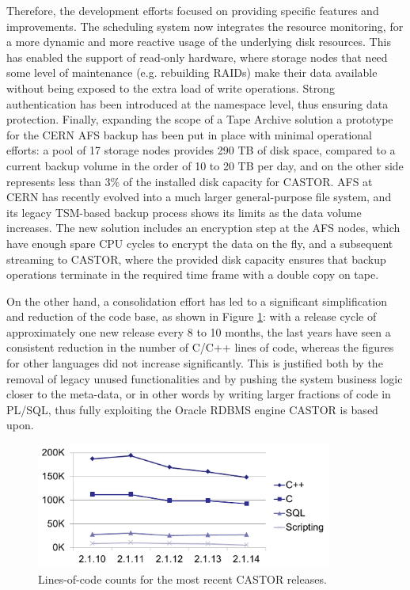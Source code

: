 \documentclass[a4paper]{jpconf}
\begin{document}
Therefore, the development efforts focused on providing specific features and improvements. The scheduling system now integrates the resource monitoring, for a more dynamic and more reactive usage of the underlying disk resources. This has enabled the support of read-only hardware, where storage nodes that need some level of maintenance (e.g. rebuilding RAIDs) make their data available without being exposed to the extra load of write operations. Strong authentication has been introduced at the namespace level, thus ensuring data protection. Finally, expanding the scope of a Tape Archive solution a prototype for the CERN AFS backup has been put in place with minimal operational efforts: a pool of 17 storage nodes provides 290 TB of disk space, compared to a current backup volume in the order of 10 to 20 TB per day, and on the other side represents less than 3\% of the installed disk capacity for CASTOR. AFS at CERN \cite{dss} \cite{afs} has recently evolved into a much larger general-purpose file system, and its legacy TSM-based backup process shows its limits as the data volume increases. The new solution includes an encryption step at the AFS nodes, which have enough spare CPU cycles to encrypt the data on the fly, and a subsequent streaming to CASTOR, where the provided disk capacity ensures that backup operations terminate in the required time frame with a double copy on tape.

On the other hand, a consolidation effort has led to a significant simplification and reduction of the code base, as shown in Figure \ref{fig:loc}: with a release cycle of approximately one new release every 8 to 10 months, the last years have seen a consistent reduction in the number of C/C++ lines of code, whereas the figures for other languages did not increase significantly. This is justified both by the removal of legacy unused functionalities and by pushing the system business logic closer to the meta-data, or in other words by writing larger fractions of code in PL/SQL, thus fully exploiting the Oracle RDBMS engine CASTOR is based upon.

\begin{figure}[h]
\begin{center}
\includegraphics[width=23pc]{LoC_plot.png}
\hspace{1pc}%
\begin{minipage}[b]{12pc}
\caption{\label{fig:loc}Lines-of-code counts for the most recent CASTOR releases.}
\end{minipage}
\end{center}
\end{figure}
\end{document}
